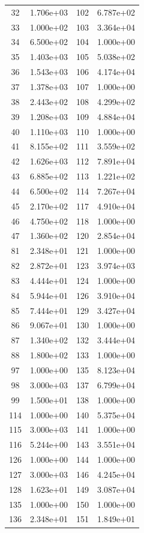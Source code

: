 \documentclass[12pt]{article}
\begin{document}
\begin{longtable}{@{}cccc@{}}
32 & 1.706e+03 & 102 & 6.787e+02 \\
33 & 1.000e+02 & 103 & 3.364e+04 \\
34 & 6.500e+02 & 104 & 1.000e+00 \\
35 & 1.403e+03 & 105 & 5.038e+02 \\
36 & 1.543e+03 & 106 & 4.174e+04 \\
37 & 1.378e+03 & 107 & 1.000e+00 \\
38 & 2.443e+02 & 108 & 4.299e+02 \\
39 & 1.208e+03 & 109 & 4.884e+04 \\
40 & 1.110e+03 & 110 & 1.000e+00 \\
41 & 8.155e+02 & 111 & 3.559e+02 \\
42 & 1.626e+03 & 112 & 7.891e+04 \\
43 & 6.885e+02 & 113 & 1.221e+02 \\
44 & 6.500e+02 & 114 & 7.267e+04 \\
45 & 2.170e+02 & 117 & 4.910e+04 \\
46 & 4.750e+02 & 118 & 1.000e+00 \\
47 & 1.360e+02 & 120 & 2.854e+04 \\
81 & 2.348e+01 & 121 & 1.000e+00 \\
82 & 2.872e+01 & 123 & 3.974e+03 \\
83 & 4.444e+01 & 124 & 1.000e+00 \\
84 & 5.944e+01 & 126 & 3.910e+04 \\
85 & 7.444e+01 & 129 & 3.427e+04 \\
86 & 9.067e+01 & 130 & 1.000e+00 \\
87 & 1.340e+02 & 132 & 3.444e+04 \\
88 & 1.800e+02 & 133 & 1.000e+00 \\
97 & 1.000e+00 & 135 & 8.123e+04 \\
98 & 3.000e+03 & 137 & 6.799e+04 \\
99 & 1.500e+01 & 138 & 1.000e+00 \\
114 & 1.000e+00 & 140 & 5.375e+04 \\
115 & 3.000e+03 & 141 & 1.000e+00 \\
116 & 5.244e+00 & 143 & 3.551e+04 \\
126 & 1.000e+00 & 144 & 1.000e+00 \\
127 & 3.000e+03 & 146 & 4.245e+04 \\
128 & 1.623e+01 & 149 & 3.087e+04 \\
135 & 1.000e+00 & 150 & 1.000e+00 \\
136 & 2.348e+01 & 151 & 1.849e+01 \\

\end{longtable}
\end{document}
